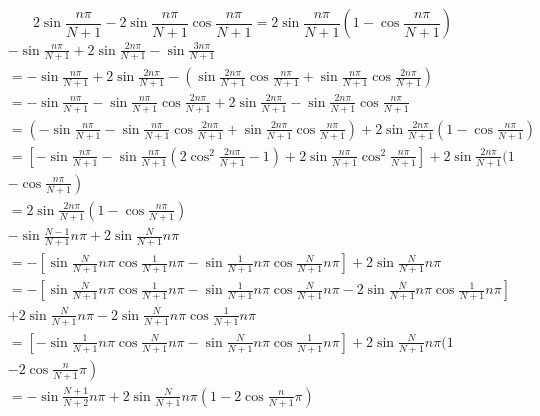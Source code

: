 \documentclass[11pt, a4paper, oneside]{ctexart}
\begin{document}
{{{\begin{appendices}
{$$
2 \sin \frac{n \pi}{N+1}-2 \sin \frac{n \pi}{N+1} \cos \frac{n \pi}{N+1}=2 \sin \frac{n \pi}{N+1}\left(1-\cos \frac{n \pi}{N+1}\right)
$$
$$
\begin{aligned}
&-\sin \frac{n \pi}{N+1}+2 \sin \frac{2 n \pi}{N+1}-\sin \frac{3 n \pi}{N+1}\\
&=-\sin \frac{n \pi}{N+1}+2 \sin \frac{2 n \pi}{N+1}-\left(\sin \frac{2 n \pi}{N+1} \cos \frac{n \pi}{N+1}+\sin \frac{n \pi}{N+1} \cos \frac{2 n \pi}{N+1}\right)\\
&=-\sin \frac{n \pi}{N+1}-\sin \frac{n \pi}{N+1} \cos \frac{2 n \pi}{N+1}+2 \sin \frac{2 n \pi}{N+1}-\sin \frac{2 n \pi}{N+1} \cos \frac{n \pi}{N+1}\\
&=\left(-\sin \frac{n \pi}{N+1}-\sin \frac{n \pi}{N+1} \cos \frac{2 n \pi}{N+1}+\sin \frac{2 n \pi}{N+1} \cos \frac{n \pi}{N+1}\right)+2 \sin \frac{2 n \pi}{N+1}\left(1-\cos \frac{n \pi}{N+1}\right)\\
&=\left[-\sin \frac{n \pi}{N+1}-\sin \frac{n \pi}{N+1}\left(2 \cos ^{2} \frac{2 n \pi}{N+1}-1\right)+2 \sin \frac{n \pi}{N+1} \cos ^{2} \frac{n \pi}{N+1}\right]+2 \sin \frac{2 n \pi}{N+1}(1\\
&\left.-\cos \frac{n \pi}{N+1}\right)\\
&=2 \sin \frac{2 n \pi}{N+1}\left(1-\cos \frac{n \pi}{N+1}\right)\\
&-\sin \frac{N-1}{N+1} n \pi+2 \sin \frac{N}{N+1} n \pi\\
&=-\left[\sin \frac{N}{N+1} n \pi \cos \frac{1}{N+1} n \pi-\sin \frac{1}{N+1} n \pi \cos \frac{N}{N+1} n \pi\right]+2 \sin \frac{N}{N+1} n \pi\\
&=-\left[\sin \frac{N}{N+1} n \pi \cos \frac{1}{N+1} n \pi-\sin \frac{1}{N+1} n \pi \cos \frac{N}{N+1} n \pi-2 \sin \frac{N}{N+1} n \pi \cos \frac{1}{N+1} n \pi\right]\\
&+2 \sin \frac{N}{N+1} n \pi-2 \sin \frac{N}{N+1} n \pi \cos \frac{1}{N+1} n \pi\\
&=\left[-\sin \frac{1}{N+1} n \pi \cos \frac{N}{N+1} n \pi-\sin \frac{N}{N+1} n \pi \cos \frac{1}{N+1} n \pi\right]+2 \sin \frac{N}{N+1} n \pi(1\\
&\left.-2 \cos \frac{n}{N+1} \pi\right)\\
&=-\sin \frac{N+1}{N+2} n \pi+2 \sin \frac{N}{N+1} n \pi\left(1-2 \cos \frac{n}{N+1} \pi\right)
\end{aligned}
$$

}
\end{appendices}}}}
\end{document}
